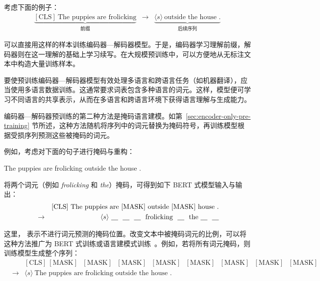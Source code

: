 考虑下面的例子：
\begin{eqnarray}
\underbrace{\mathrm{[CLS]}\ \textrm{The puppies are frolicking}}_{\textrm{前缀}} & \to & \underbrace{\langle s \rangle\ \textrm{outside the house .}}_{\textrm{后续序列}} \nonumber
\end{eqnarray}

\noindent 可以直接用这样的样本训练编码器—解码器模型。于是，编码器学习理解前缀，解码器则在这一理解的基础上学习续写。在大规模预训练中，可以方便地从无标注文本中构造大量训练样本。

要使预训练编码器—解码器模型有效处理多语言和跨语言任务（如机器翻译），应当使用多语言数据训练。这通常要求词表包含多种语言的词元。这样，模型便可学习不同语言的共享表示，从而在多语言和跨语言环境下获得语言理解与生成能力。

编码器—解码器预训练的第二种方法是掩码语言建模。如第~\ref{sec:encoder-only-pre-training} 节所述，这种方法随机将序列中的词元替换为掩码符号，再训练模型根据受损序列预测这些被掩码的词元。

例如，考虑对下面的句子进行掩码与重构：

\vspace{0.5em}
\begin{center}
The puppies are frolicking outside the house .
\end{center}
\vspace{0.5em}

\noindent 将两个词元（例如 \textit{frolicking} 和 \textit{the}）掩码，可得到如下 BERT 式模型输入与输出：
\begin{eqnarray}
&     & \mathrm{[CLS]}\ \textrm{The puppies are $\mathrm{[MASK]}$ outside $\mathrm{[MASK]}$ house .} \nonumber \\
& \to & \langle s \rangle\ \textrm{\underline{\hspace{1em}}\ \ \underline{\hspace{1em}}\ \ \underline{\hspace{1em}}\ \ frolicking\ \ \underline{\hspace{1em}}\ \ the \underline{\hspace{1em}}\ \ \underline{\hspace{1em}}} \nonumber
\end{eqnarray}

\noindent 这里，\underline{\hspace{1em}} 表示不进行词元预测的掩码位置。改变文本中被掩码词元的比例，可以将这种方法推广为 BERT 式训练或语言建模式训练~\cite{song-etal:2019mass}。例如，若将所有词元掩码，则训练模型生成整个序列：
\begin{eqnarray}
&     & \mathrm{[CLS]}\ \textrm{$\mathrm{[MASK]}$ $\mathrm{[MASK]}$ $\mathrm{[MASK]}$ $\mathrm{[MASK]}$ $\mathrm{[MASK]}$ $\mathrm{[MASK]}$ $\mathrm{[MASK]}$ $\mathrm{[MASK]}$} \nonumber \\
& \to & \langle s \rangle\ \textrm{The puppies are frolicking outside the house .} \nonumber
\end{eqnarray}

